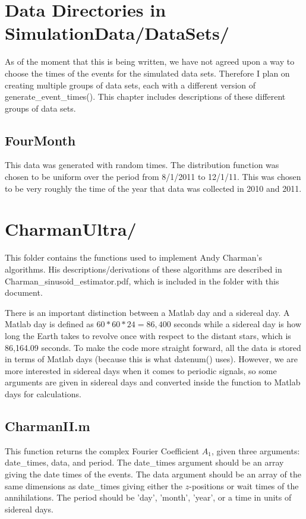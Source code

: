 \documentclass[12pt]{report}
\begin{document}
\chapter{Data Directories in SimulationData/DataSets/}
\label{chap:data_directories}
As of the moment that this is being written, we have not agreed upon a way to choose the times of the events for the simulated data sets.  Therefore I plan on creating multiple groups of data sets, each with a different version of generate\_event\_times().  This chapter includes descriptions of these different groups of data sets.

\section{FourMonth}
This data was generated with random times.  The distribution function was chosen to be uniform over the period from 8/1/2011 to 12/1/11.  This was chosen to be very roughly the time of the year that data was collected in 2010 and 2011.





\chapter{CharmanUltra/}
This folder contains the functions used to implement Andy Charman's algorithms.  His descriptions/derivations of these algorithms are described in Charman\_sinusoid\_estimator.pdf, which is included in the folder with this document.

There is an important distinction between a Matlab day and a sidereal day.  A Matlab day is defined as $60*60*24=86,400$ seconds while a sidereal day is how long the Earth takes to revolve once with respect to the distant stars, which is 86,164.09 seconds.  To make the code more straight forward, all the data is stored in terms of Matlab days (because this is what datenum() uses).  However, we are more interested in sidereal days when it comes to periodic signals, so some arguments are given in sidereal days and converted inside the function to Matlab days for calculations.

\section{CharmanII.m}
This function returns the complex Fourier Coefficient $A_1$, given three arguments: date\_times, data, and period.  The date\_times argument should be an array giving the date times of the events.  The data argument should be an array of the same dimensions as date\_times giving either the $z$-positions or wait times of the annihilations.  The period should be 'day', 'month', 'year', or a time in units of sidereal days.
\end{document}
